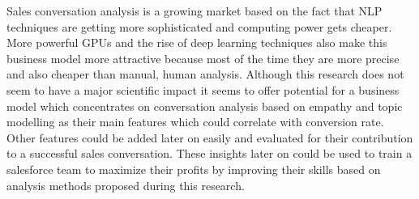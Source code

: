 \documentclass[twoside]{article}
\begin{document}
\begin{multicols}{2}
Sales conversation analysis is a growing market based on the fact that NLP techniques are getting more sophisticated and computing power gets cheaper. More powerful GPUs and the rise of deep learning techniques also make this business model more attractive because most of the time they are more precise and also cheaper than manual, human analysis. Although this research does not seem to have a major scientific impact it seems to offer potential for a business model which concentrates on conversation analysis based on empathy and topic modelling as their main features which could correlate with conversion rate. Other features could be added later on easily and evaluated for their contribution to a successful sales conversation. These insights later on could be used to train a salesforce team to maximize their profits by improving their skills based on analysis methods proposed during this research.



{}






\end{multicols}
\end{document}
